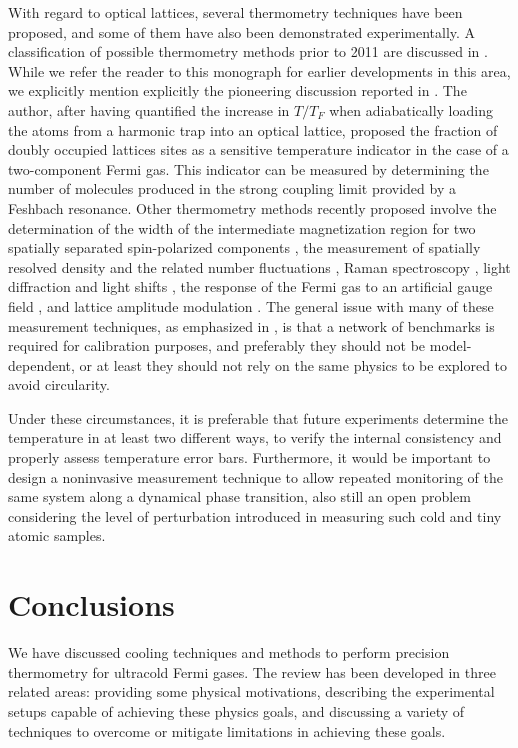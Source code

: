 \documentclass[pra,letterpaper,twocolumn,showpacs,superscriptaddress]{revtex4}
\begin{document}
With regard to optical lattices, several thermometry techniques have been proposed, and some of them have also been  demonstrated experimentally. 
A classification of possible thermometry methods prior to 2011 are discussed in \cite{McKayRev2011}. While we refer the reader to this monograph for earlier 
developments in this area, we explicitly mention explicitly the pioneering discussion reported in \cite{Kohl2006}. The author, after having quantified the increase 
in $T/T_F$ when adiabatically loading the atoms from a harmonic trap into an optical lattice, proposed the fraction of doubly occupied lattices sites as a sensitive temperature 
indicator in the case of a two-component Fermi gas. This indicator can be measured by determining the number of molecules produced in the strong coupling limit 
provided by a Feshbach resonance. Other thermometry methods recently proposed involve the determination of the width of the intermediate magnetization region for two 
spatially separated spin-polarized components \cite{Weld2009,Weld2010},  the measurement of spatially resolved density and the related number fluctuations \cite{Zhou2011}, 
Raman spectroscopy \cite{Bernier2010}, light diffraction \cite{Ruostekoski2009} and light shifts \cite{McDonald2015}, the response of the Fermi gas to an 
artificial gauge field \cite{Roscilde2014}, and lattice amplitude modulation \cite{Loida2015}.
The general issue with many of these measurement techniques, as emphasized in \cite{McKayRev2011}, is that a network of benchmarks is required for calibration purposes, 
and preferably they should not be model-dependent, or at least they should not rely on the same physics to be explored to avoid circularity.

Under these circumstances, it is preferable that future experiments determine the temperature in at least two different ways, to verify the internal 
consistency and properly assess temperature error bars. Furthermore, it would be important to design a noninvasive measurement technique to allow repeated monitoring 
of the same system along a dynamical phase transition, also still an open problem considering the level of perturbation introduced in measuring such cold 
and tiny atomic samples.

\section{Conclusions}

We have discussed cooling techniques and methods to perform precision thermometry for ultracold Fermi gases. 
The review has been developed in three related areas: providing some physical motivations, describing the experimental 
setups capable of achieving these physics goals, and discussing a variety of techniques to overcome or mitigate limitations in achieving these goals. 
\end{document}
